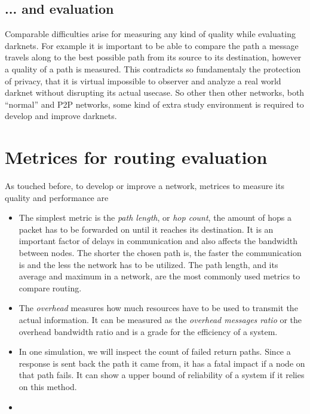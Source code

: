 \subsection{... and evaluation}

Comparable difficulties arise for measuring any kind of quality while evaluating darknets. For example it is important to be able to compare the path a message travels along to the best possible path from its source to its destination, however a quality of a path is measured. This contradicts so fundamentaly the protection of privacy, that it is virtual impossible to observer and analyze a real world darknet without disrupting its actual usecase. So other then other networks, both ``normal'' and P2P networks, some kind of extra study environment is required to develop and improve darknets.


\section{Metrices for routing evaluation}

As touched before, to develop or improve a network, metrices to measure its quality and performance are 

\begin{itemize}
\item The simplest metric is the \emph{path length}, or \emph{hop count}, the amount of hops a packet has to be forwarded on until it reaches its destination. It is an important factor of delays in communication and also affects the bandwidth between nodes. The shorter the chosen path is, the faster the communication is and the less the network has to be utilized. The path length, and its average and maximum in a network, are the most commonly used metrics to compare routing.

\item The \emph{overhead} measures how much resources have to be used to transmit the actual information. It can be measured as the \emph{overhead messages ratio} or the overhead bandwidth ratio and is a grade for the efficiency of a system.

\item In one simulation, we will inspect the count of failed return paths. Since a response is sent back the path it came from, it has a fatal impact if a node on that path fails. It can show a upper bound of reliability of a system if it relies on this method.

\item {}
\end{itemize}

